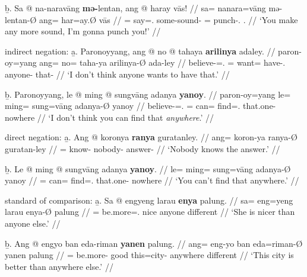 	\b{b.} \begingl
		\gla Sa @ na-naravāng \textbf{mə-}lentan, ang @ haray vās! //
		\glb sa= na\til{}nara=vāng mə-lentan-Ø ang= har=ay.Ø vās //
		\glc \PatT{}= \Iter{}\til{}say=\Second{}.\Aarg{} some-sound-\Top{} 
			\AgtT{}= punch-\Fsg{}.\Top{} \Second{}.\Parg{} //
		\glft `You make any more sound, I'm gonna punch you!' //
		\endgl
	\endsubsub

\a indirect negation:\vspace{.5em} %
	\beginsubsub
	\b{a.} \begingl
		\gla Paronoyyang, ang @ no @ tahaya \textbf{arilinya} adaley. //
		\glb paron-oy=yang ang= no= taha-ya arilinya-Ø ada-ley //
		\glc believe-\Neg{}=\Fsg{}.\Aarg{} \AgtT{}= want= 
			have-\Tsg{}.\M{} anyone-\Top{} that-\PargI{} //
		\glft `I don't think anyone wants to have that.' //
		\endgl\vspace{.5em}
	
	\b{b.} \begingl
		\gla Paronoyyang, le @ ming @ sungvāng adanya \textbf{yanoy}. //
		\glb paron-oy=yang le= ming= sung=vāng adanya-Ø yanoy //
		\glc believe-\Neg{}=\Fsg{}.\Aarg{} \PatTI{}= can= 
			find=\Second{}.\Aarg{} that.one-\Top{} nowhere //
		\glft `I don't think you can find that \emph{anywhere}.' //
		\endgl
	\endsubsub

\a direct negation:\vspace{.5em} %
	\beginsubsub
	\b{a.} \begingl
		\gla Ang @ koronya \textbf{ranya} guratanley. //
		\glb ang= koron-ya ranya-Ø guratan-ley //
		\glc \AgtT{}= know-\TsgM{} nobody-\Top{} answer-\PargI{} //
		\glft `Nobody knows the answer.' //
		\endgl\vspace{.5em}
		
	\b{b.} \begingl
		\gla Le @ ming @ sungvāng adanya \textbf{yanoy}. //
		\glb le= ming= sung=vāng adanya-Ø yanoy //
		\glc \PatTI{}= can= find=\Second{}.\Aarg{} that.one-\Top{} nowhere //
		\glft `You can't find that anywhere.' //
		\endgl
	\endsubsub

\a standard of comparison:\vspace{.5em} %
	\beginsubsub
	\b{a.} \begingl
		\gla Sa @ engyeng larau \textbf{enya} palung. //
		\glb sa= eng=yeng larau enya-Ø palung //
		\glc \PatT{}= be.more=\TsgF{}.\Aarg{} nice anyone different //
		\glft `She is nicer than anyone else.' //
		\endgl\vspace{.5em}
		
	\b{b.} \begingl
		\gla Ang @ engyo ban eda-riman \textbf{yanen} palung. //
		\glb ang= eng-yo ban eda=riman-Ø yanen palung //
		\glc \AgtT{}= be.more-\TsgN{} good this=city-\Top{} anywhere 
			different //
		\glft `This city is better than anywhere else.' //
		\endgl
	\endsubsub

